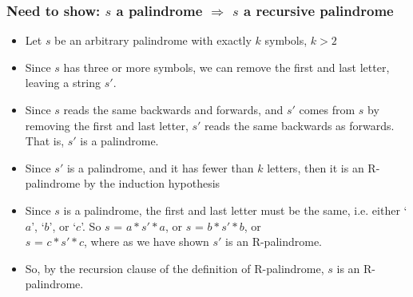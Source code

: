  \begin{frame}
\frametitle{Need to show: $s$ a palindrome $\Rightarrow$ $s$ a recursive palindrome}

\begin{itemize}[<+->]


\item Let $s$ be an arbitrary palindrome with exactly $k$  symbols, $k >2$

\item Since $s$ has three or more symbols, we can remove the first and last letter, leaving a string $s'$. 

\item Since $s$ reads the same backwards and forwards, and $s'$ comes from $s$ by removing the first and last letter, $s'$ reads the same backwards as forwards. That is, $s'$ is a palindrome. 

\item Since $s'$ is a palindrome, and it has fewer than
$k$ letters, then it is an R-palindrome by the induction hypothesis

\item Since $s$ is a palindrome, the first and last letter must be the same, i.e. either 
`$a$', `$b$', or `$c$'. So $s$ = $a*s'*a$, or $s$ = $b*s'*b$, or \\ $s$ = $c*s'*c$, where as we have shown $s'$ is an R-palindrome. 

\item So, by the recursion clause of the definition of R-palindrome, $s$ is an R-palindrome.

\end{itemize} 
\end{frame}

